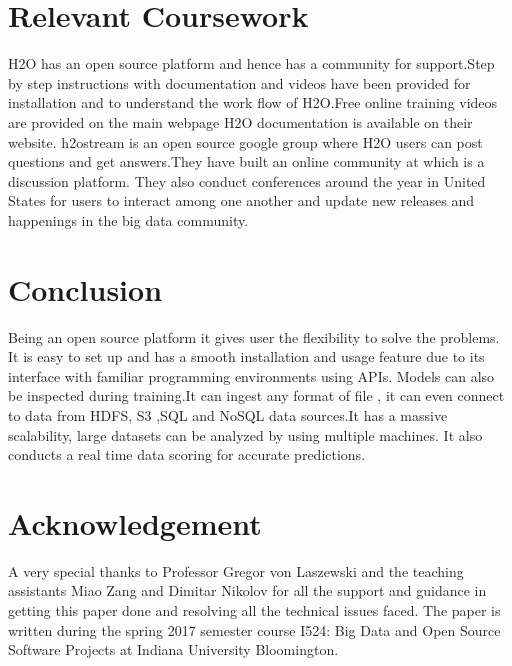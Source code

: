 \documentclass[9pt,twocolumn,twoside]{styles/osajnl}
\begin{document}
\section {Relevant Coursework}

H2O has an open source platform and hence has a community for
support.\newline Step by step instructions with documentation and
videos have been provided for installation and to understand the work
flow of H2O.\newline Free online training videos are provided on the
main webpage \cite{www-h2o-learn} \newline H2O documentation is
available on their website.  \cite{www-h2o-webpage}\newline h2ostream
is an open source google group where H2O users can post questions and
get answers.\newline They have built an online community
at\cite{www-h2o-community} which is a discussion platform.\newline
They also conduct conferences around the year in United States for
users to interact among one another and update new releases and
happenings in the big data community.\cite{www-h2o-meetups}

\section{Conclusion}
\cite{www-h2o-why}Being an open source platform it gives
user the flexibility to solve the problems. It is easy to set up and
has a smooth installation and usage feature due to its interface with
familiar programming environments using APIs. Models can also be
inspected during training.It can ingest any format of file , it can
even connect to data from HDFS, S3 ,SQL and NoSQL data sources.It has
a massive scalability, large datasets can be analyzed by using
multiple machines. It also conducts a real time data scoring for
accurate predictions.

\section{Acknowledgement}
A very special thanks to Professor Gregor von Laszewski and the
teaching assistants Miao Zang and Dimitar Nikolov for all the support
and guidance in getting this paper done and resolving all the
technical issues faced. The paper is written during the spring 2017
semester course {I524: Big Data and Open Source Software Projects} at
Indiana University Bloomington.


\end{document}
